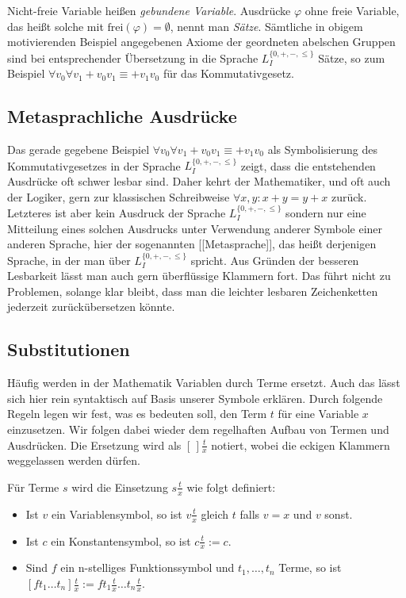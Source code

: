 Nicht-freie Variable heißen \textit{gebundene Variable}. Ausdrücke $\varphi$ ohne freie Variable, das heißt solche mit $\mathrm{frei}(\varphi)=\emptyset $, nennt man \textit{Sätze}. Sämtliche in obigem motivierenden Beispiel angegebenen Axiome der geordneten abelschen Gruppen sind bei entsprechender Übersetzung in die Sprache $L_I^{\{0,+,-,\le\}}$ Sätze, so zum Beispiel $\forall v_0 \forall v_1 +\!v_0v_1\equiv +v_1v_0$ für das Kommutativgesetz.

\subsection{Metasprachliche Ausdrücke}
Das gerade gegebene Beispiel $\forall v_0 \forall v_1 +\!v_0v_1\equiv +v_1v_0$ als Symbolisierung des Kommutativgesetzes in der Sprache $L_I^{\{0,+,-,\le\}}$ zeigt, dass die entstehenden Ausdrücke oft schwer lesbar sind. Daher kehrt der Mathematiker, und oft auch der Logiker, gern zur klassischen Schreibweise $\forall x,y: x+y = y+x$ zurück. Letzteres ist aber kein Ausdruck der Sprache $L_I^{\{0,+,-,\le\}}$ sondern nur eine Mitteilung eines solchen Ausdrucks unter Verwendung anderer Symbole einer anderen Sprache, hier der sogenannten [[Metasprache]], das heißt derjenigen Sprache, in der man über $L_I^{\{0,+,-,\le\}}$ spricht. Aus Gründen der besseren Lesbarkeit lässt man auch gern überflüssige Klammern fort. Das führt nicht zu Problemen, solange klar bleibt, dass man die leichter lesbaren Zeichenketten jederzeit zurückübersetzen könnte.

\subsection{Substitutionen}
Häufig werden in der Mathematik Variablen durch Terme ersetzt. Auch das lässt sich hier rein syntaktisch auf Basis unserer Symbole erklären. Durch folgende Regeln legen wir fest, was es bedeuten soll, den Term $t$ für eine Variable $x$ einzusetzen. Wir folgen dabei wieder dem regelhaften Aufbau von Termen und Ausdrücken. Die Ersetzung wird als $[\,]\frac{t}{x}$ notiert, wobei die eckigen Klammern weggelassen werden dürfen.

Für Terme $s$ wird die Einsetzung $s\frac{t}{x}$ wie folgt definiert:

\begin{itemize}
	\item Ist $v$ ein Variablensymbol, so ist $v\frac{t}{x}$ gleich $t$ falls $v=x$ und $v$ sonst.
	\item Ist $c$ ein Konstantensymbol, so ist $c\frac{t}{x}:=c$.
	\item Sind $f$ ein n-stelliges Funktionssymbol und $t_1,\ldots,t_n$ Terme, so ist $[ft_1\ldots t_n]\frac{t}{x} := ft_1\frac{t}{x}\ldots t_n\frac{t}{x}$.
\end{itemize}

